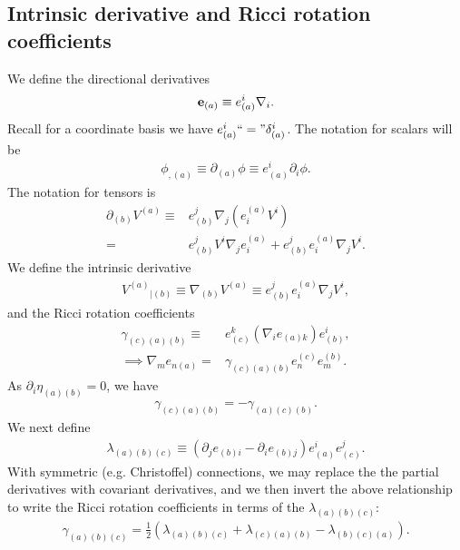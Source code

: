 \documentclass[12pt]{report}
\begin{document}
\subsection{Intrinsic derivative and Ricci rotation coefficients}
	We define the directional derivatives
\begin{align}
	{\bf e}_{(a)}
	\equiv
	e_{(a)}^i\nabla_i
	.
\end{align}
	Recall for a coordinate basis we have $e^i_{(a)}``="\delta^i_{(a)}$.
The notation for scalars will be 
\begin{align}
	\phi_{,(a)}
	\equiv
	\partial_{(a)}\phi
	\equiv
	e_{(a)}^i\partial_i\phi
	.
\end{align}
	The notation for tensors is
\begin{align}
	\partial_{(b)}V^{(a)}
	\equiv &
	e^j_{(b)}\nabla_j\left(e^{(a)}_iV^i\right)
	\nonumber \\
	= &
	e^j_{(b)} V^i\nabla_je^{(a)}_{i}
+	e^j_{(b)}e^{(a)}_i\nabla_jV^i
	.
\end{align}
	We define the intrinsic derivative
\begin{align}
\label{eq:def_intrinsic_der}
	V^{(a)}{}_{|(b)}
	\equiv
	\nabla_{(b)}V^{(a)}
	\equiv
	e^j_{(b)}e^{(a)}_i\nabla_jV^i
	,	
\end{align}
	and the Ricci rotation coefficients
\begin{align}
\label{eq:def_Ricci_rotation}
	\gamma_{{(c)}{(a)}{(b)}}
	\equiv &
	e_{(c)}^k \left(\nabla_ie_{{(a)}k}\right) e_{(b)}^i
	, \\
\implies \nabla_me_{n(a)}
	= &
	\gamma_{(c)(a)(b)}e^{(c)}_ne^{(b)}_m
	. 
\end{align}
	As $\partial_i\eta_{{(a)}{(b)}}=0$, we have
\begin{align}
	\gamma_{{(c)}{(a)}{(b)}}
	=
-	\gamma_{{(a)}{(c)}{(b)}}
	.
\end{align}
	We next define	
\begin{align}
\label{eq:def_lambda_coef}
	\lambda_{{(a)}{(b)}{(c)}}
	\equiv
	\left(
		\partial_je_{{(b)}i}
	-	\partial_ie_{{(b)}j}
	\right)
	e^i_{(a)}e^j_{(c)}
	.
\end{align}
	With symmetric (e.g. Christoffel)
connections, we may replace the the partial derivatives with
covariant derivatives, and we then invert the above relationship
to write the Ricci rotation coefficients in terms
of the $\lambda_{(a)(b)(c)}$:
\begin{align}
	\gamma_{(a)(b)(c)}
	=
	\frac{1}{2}\left(
		\lambda_{(a)(b)(c)}
	+	\lambda_{(c)(a)(b)}
	-	\lambda_{(b)(c)(a)}
	\right)
	.
\end{align} 
\end{document}
